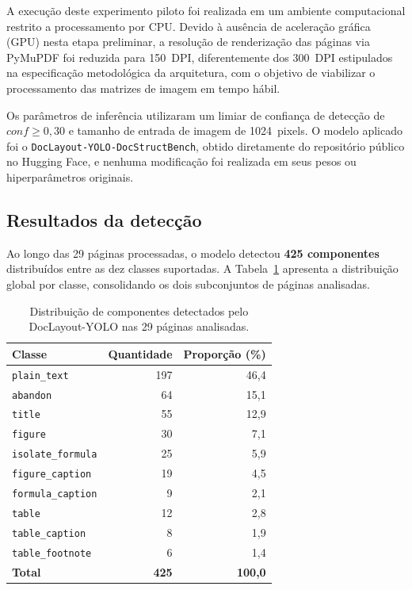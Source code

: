 A execução deste experimento piloto foi realizada em um ambiente computacional restrito a processamento por CPU. Devido à ausência de aceleração gráfica (GPU) nesta etapa preliminar, a resolução de renderização das páginas via PyMuPDF foi reduzida para 150~DPI, diferentemente dos 300~DPI estipulados na especificação metodológica da arquitetura, com o objetivo de viabilizar o processamento das matrizes de imagem em tempo hábil. 

Os parâmetros de inferência utilizaram um limiar de confiança de detecção de $conf \geq 0{,}30$ e tamanho de entrada de imagem de 1024~pixels. O modelo aplicado foi o \texttt{DocLayout-YOLO-DocStructBench}, obtido diretamente do repositório público no Hugging Face, e nenhuma modificação foi realizada em seus pesos ou hiperparâmetros originais.

\subsection{Resultados da detecção}
\label{subsec:dla_resultados}

Ao longo das 29 páginas processadas, o modelo detectou \textbf{425
componentes} distribuídos entre as dez classes suportadas. A
Tabela~\ref{tab:dla_distribuicao} apresenta a distribuição global por
classe, consolidando os dois subconjuntos de páginas analisadas.

\begin{table}[htb]
\centering
\caption{Distribuição de componentes detectados pelo DocLayout-YOLO nas 29 páginas analisadas.}
\label{tab:dla_distribuicao}
\begin{tabular}{lrr}
\toprule
\textbf{Classe} & \textbf{Quantidade} & \textbf{Proporção (\%)} \\
\midrule
\texttt{plain\_text}      & 197 & 46,4 \\
\texttt{abandon}          &  64 & 15,1 \\
\texttt{title}            &  55 & 12,9 \\
\texttt{figure}           &  30 &  7,1 \\
\texttt{isolate\_formula} &  25 &  5,9 \\
\texttt{figure\_caption}  &  19 &  4,5 \\
\texttt{formula\_caption} &   9 &  2,1 \\
\texttt{table}            &  12 &  2,8 \\
\texttt{table\_caption}   &   8 &  1,9 \\
\texttt{table\_footnote}  &   6 &  1,4 \\
\midrule
\textbf{Total}            & \textbf{425} & \textbf{100,0} \\
\bottomrule
\end{tabular}
\end{table}


